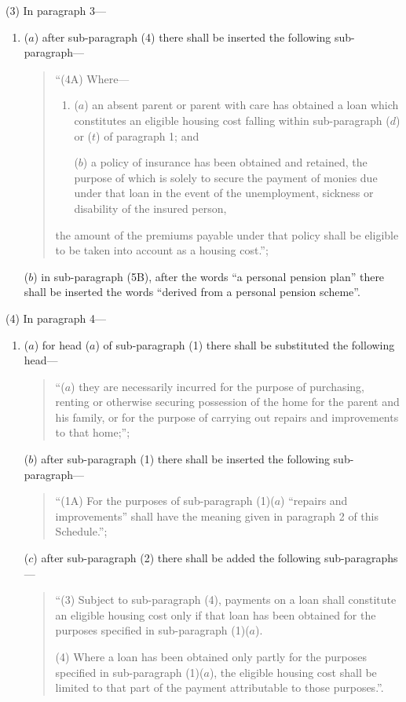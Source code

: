 \documentclass[12pt,a4paper]{article}
\begin{document}
(3) In paragraph 3—
\begin{enumerate}\item[]
($a$) after sub-paragraph (4) there shall be inserted the following sub-paragraph—
\begin{quotation}
“(4A) Where—
\begin{enumerate}\item[]
($a$) an absent parent or parent with care has obtained a loan which constitutes an eligible housing cost falling within sub-paragraph ($d$) or ($t$) of paragraph 1; and

($b$) a policy of insurance has been obtained and retained, the purpose of which is solely to secure the payment of monies due under that loan in the event of the unemployment, sickness or disability of the insured person,
\end{enumerate}
the amount of the premiums payable under that policy shall be eligible to be taken into account as a housing cost.”;
\end{quotation}

($b$) in sub-paragraph (5B), after the words “a personal pension plan” there shall be inserted the words “derived from a personal pension scheme”.
\end{enumerate}

(4) In paragraph 4—
\begin{enumerate}\item[]
($a$) for head ($a$) of sub-paragraph (1) there shall be substituted the following head—
\begin{quotation}
“($a$) they are necessarily incurred for the purpose of purchasing, renting or otherwise securing possession of the home for the parent and his family, or for the purpose of carrying out repairs and improvements to that home;”;
\end{quotation}

($b$) after sub-paragraph (1) there shall be inserted the following sub-paragraph—
\begin{quotation}
“(1A) For the purposes of sub-paragraph (1)($a$) “repairs and improvements” shall have the meaning given in paragraph 2 of this Schedule.”;
\end{quotation}

($c$) after sub-paragraph (2) there shall be added the following sub-paragraphs—
\begin{quotation}
“(3) Subject to sub-paragraph (4), payments on a loan shall constitute an eligible housing cost only if that loan has been obtained for the purposes specified in sub-paragraph (1)($a$).

(4) Where a loan has been obtained only partly for the purposes specified in sub-paragraph (1)($a$), the eligible housing cost shall be limited to that part of the payment attributable to those purposes.”.
\end{quotation}
\end{enumerate}
\end{document}
